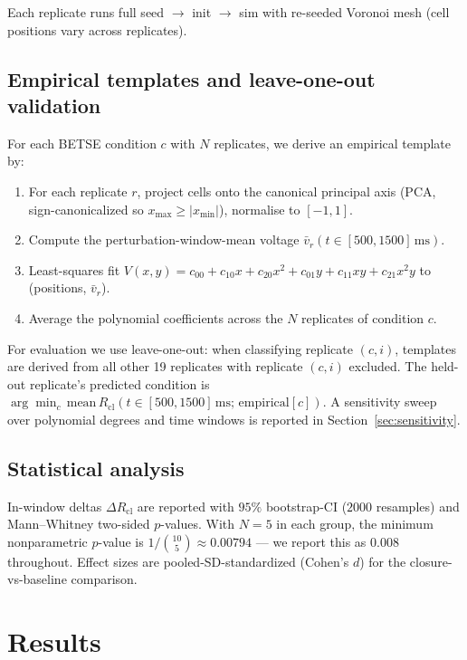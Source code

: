 \documentclass[11pt,a4paper]{article}
\begin{document}
Each replicate runs full seed $\to$ init $\to$ sim with re-seeded Voronoi mesh (cell positions vary across replicates).

\subsection{Empirical templates and leave-one-out validation}\label{sec:empirical-templates}

For each BETSE condition $c$ with $N$ replicates, we derive an empirical template by:

\begin{enumerate}\itemsep0pt
\item For each replicate $r$, project cells onto the canonical principal axis (PCA, sign-canonicalized so $x_{\max}\geq|x_{\min}|$), normalise to $[-1,1]$.
\item Compute the perturbation-window-mean voltage $\bar v_{r}(t\in[500,1500]\,\mathrm{ms})$.
\item Least-squares fit $V(x,y)=c_{00}+c_{10}x+c_{20}x^{2}+c_{01}y+c_{11}xy+c_{21}x^{2}y$ to (positions, $\bar v_{r}$).
\item Average the polynomial coefficients across the $N$ replicates of condition $c$.
\end{enumerate}

For evaluation we use leave-one-out: when classifying replicate $(c,i)$, templates are derived from all other 19 replicates with replicate $(c,i)$ excluded. The held-out replicate's predicted condition is $\arg\min_{c}\,\mathrm{mean}\,R_{\mathrm{cl}}(t\in[500,1500]\,\mathrm{ms};\,\mathrm{empirical}[c])$. A sensitivity sweep over polynomial degrees and time windows is reported in Section~\ref{sec:sensitivity}.

\subsection{Statistical analysis}

In-window deltas $\Delta R_{\mathrm{cl}}$ are reported with $95\%$ bootstrap-CI ($2000$ resamples) and Mann--Whitney two-sided $p$-values. With $N=5$ in each group, the minimum nonparametric $p$-value is $1/\binom{10}{5}\approx 0.00794$ --- we report this as $0.008$ throughout. Effect sizes are pooled-SD-standardized (Cohen's $d$) for the closure-vs-baseline comparison.

\section{Results}\label{sec:results}
\end{document}
